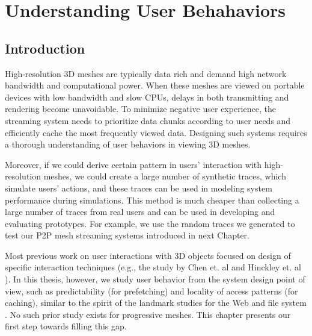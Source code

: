 \chapter{Understanding User Behahaviors}
\label{c:user}
\section{Introduction}
High-resolution 3D meshes are typically data rich and demand high network bandwidth 
and computational power. 
When these meshes are viewed on portable devices with
low bandwidth and slow CPUs, delays in both transmitting and
rendering become unavoidable. To minimize negative user experience, the
streaming system needs to prioritize data chunks according to user needs and
efficiently cache the most frequently viewed data.  Designing such
systems requires a thorough understanding of user behaviors in viewing 3D
meshes.

Moreover, if we could derive certain pattern in users' interaction with
high-resolution meshes, we could create a large number of synthetic traces,
which simulate users' actions, and these traces can be used in modeling system
performance during simulations. This method is much cheaper than collecting 
a large number of traces from real users and can be used in developing and evaluating
prototypes. For example, we use the random traces we generated to test our P2P mesh
streaming systems introduced in next Chapter.

Most previous work on user interactions with 3D objects
focused on design of specific interaction
techniques
(e.g., the study by Chen et. al \cite{chen88study} and Hinckley et. al \cite{hinckley97usability}). 
In this thesis, however, we study
user behavior from the system design point of view, 
such as predictability (for prefetching) and locality of access patterns (for caching),
similar to the spirit of the landmark studies for the Web \cite{huberman98web} and file system \cite{ousterhout85trace}.  
No such prior study exists for progressive meshes. This chapter presents our first step towards filling 
this gap.

